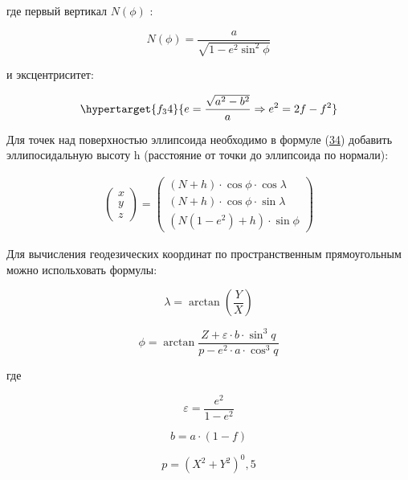 \documentclass[a4paper,14pt]{article}
\newcommand\indent[1][1cm]{\hspace*{#1}}
\begin{document}
где первый вертикал $N(\phi)$ :

\begin{equation}
    N(\phi) = \frac{a}{\sqrt{1 - e^2 \sin^2{\phi}}}
\end{equation}

и эксцентриситет:

\begin{equation}
    \hypertarget{f_34}{e = \frac{\sqrt{a^2 - b^2}}{a} \Rightarrow e^2 = 2f - f^2}
\end{equation}

\indent Для точек над поверхностью эллипсоида необходимо в формуле (\hyperlink{f_34}{34}) добавить эллипосидальную высоту h (расстояние от точки до эллипсоида по нормали):

\begin{gather}
    \begin{pmatrix} x \\ y \\ z \end{pmatrix} = 
    \begin{pmatrix}
        (N+h) \cdot \cos\phi \cdot \cos\lambda\\
        (N+h) \cdot \cos\phi \cdot \sin\lambda\\
        (N(1 - e^2) +h) \cdot \sin\phi
    \end{pmatrix}
\end{gather}

\indent Для вычисления геодезических координат по пространственным прямоугольным можно испольховать формулы:

\begin{equation}
    \lambda = \arctan \left(\frac{Y}{X} \right)
\end{equation}

\begin{equation}
    \phi = \arctan \frac{Z + \varepsilon \cdot b \cdot \sin^3{q}}{p - e^2 \cdot a \cdot \cos^3{q}}
\end{equation}

где

\begin{equation}
   \varepsilon = \frac{e^2}{1 - e^2} 
\end{equation}

\begin{equation}
    b = a \cdot (1 - f)
\end{equation}

\begin{equation}
    p = \left (X^2 + Y^2 \right)^0,5
\end{equation}
\end{document}

